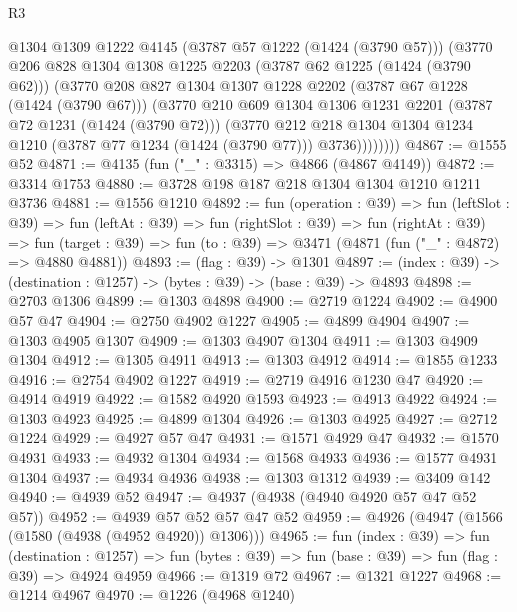 \begin{lexlean}{R3}
\begin{coremodule}
            @1304
            @1309
            @1222
            @4145
            (@3787 @57 @1222 (@1424 (@3790 @57)))
            (@3770
              @206
              @828
              @1304
              @1308
              @1225
              @2203
              (@3787 @62 @1225 (@1424 (@3790 @62)))
              (@3770
                @208
                @827
                @1304
                @1307
                @1228
                @2202
                (@3787 @67 @1228 (@1424 (@3790 @67)))
                (@3770
                  @210
                  @609
                  @1304
                  @1306
                  @1231
                  @2201
                  (@3787 @72 @1231 (@1424 (@3790 @72)))
                  (@3770
                    @212
                    @218
                    @1304
                    @1304
                    @1234
                    @1210
                    (@3787 @77 @1234 (@1424 (@3790 @77)))
                    @3736))))))))
@4867 := @1555 @52
@4871 := @4135 (fun ("_" : @3315) => @4866 (@4867 @4149))
@4872 := @3314 @1753
@4880 := @3728 @198 @187 @218 @1304 @1304 @1210 @1211 @3736
@4881 := @1556 @1210
@4892 := fun (operation : @39) =>
  fun (leftSlot : @39) =>
  fun (leftAt : @39) =>
  fun (rightSlot : @39) =>
  fun (rightAt : @39) =>
  fun (target : @39) => fun (to : @39) => @3471 (@4871 (fun ("_" : @4872) => @4880 @4881))
@4893 := (flag : @39) -> @1301
@4897 := (index : @39) -> (destination : @1257) -> (bytes : @39) -> (base : @39) -> @4893
@4898 := @2703 @1306
@4899 := @1303 @4898
@4900 := @2719 @1224
@4902 := @4900 @57 @47
@4904 := @2750 @4902 @1227
@4905 := @4899 @4904
@4907 := @1303 @4905 @1307
@4909 := @1303 @4907 @1304
@4911 := @1303 @4909 @1304
@4912 := @1305 @4911
@4913 := @1303 @4912
@4914 := @1855 @1233
@4916 := @2754 @4902 @1227
@4919 := @2719 @4916 @1230 @47
@4920 := @4914 @4919
@4922 := @1582 @4920 @1593
@4923 := @4913 @4922
@4924 := @1303 @4923
@4925 := @4899 @1304
@4926 := @1303 @4925
@4927 := @2712 @1224
@4929 := @4927 @57 @47
@4931 := @1571 @4929 @47
@4932 := @1570 @4931
@4933 := @4932 @1304
@4934 := @1568 @4933
@4936 := @1577 @4931 @1304
@4937 := @4934 @4936
@4938 := @1303 @1312
@4939 := @3409 @142
@4940 := @4939 @52
@4947 := @4937 (@4938 (@4940 @4920 @57 @47 @52 @57))
@4952 := @4939 @57 @52 @57 @47 @52
@4959 := @4926 (@4947 (@1566 (@1580 (@4938 (@4952 @4920)) @1306)))
@4965 := fun (index : @39) =>
  fun (destination : @1257) =>
  fun (bytes : @39) => fun (base : @39) => fun (flag : @39) => @4924 @4959
@4966 := @1319 @72
@4967 := @1321 @1227
@4968 := @1214 @4967
@4970 := @1226 (@4968 @1240)

\end{coremodule}
\end{lexlean}
